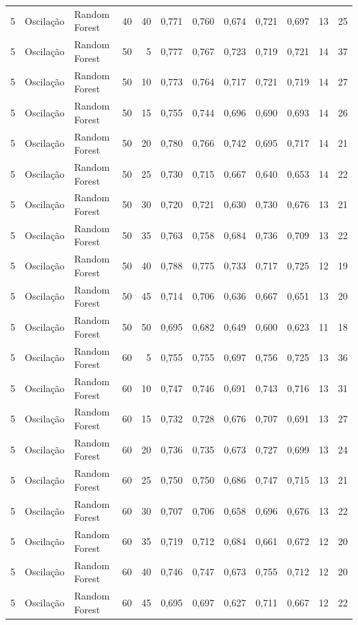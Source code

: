 \begin{longtable}{@{}rllrrrrrrrrr@{}}
5 & Oscilação & Random Forest & 40 & 40 & 0,771 & 0,760 & 0,674 & 0,721 & 0,697 & 13 & 25 \\
5 & Oscilação & Random Forest & 50 & 5 & 0,777 & 0,767 & 0,723 & 0,719 & 0,721 & 14 & 37 \\
5 & Oscilação & Random Forest & 50 & 10 & 0,773 & 0,764 & 0,717 & 0,721 & 0,719 & 14 & 27 \\
5 & Oscilação & Random Forest & 50 & 15 & 0,755 & 0,744 & 0,696 & 0,690 & 0,693 & 14 & 26 \\
5 & Oscilação & Random Forest & 50 & 20 & 0,780 & 0,766 & 0,742 & 0,695 & 0,717 & 14 & 21 \\
5 & Oscilação & Random Forest & 50 & 25 & 0,730 & 0,715 & 0,667 & 0,640 & 0,653 & 14 & 22 \\
5 & Oscilação & Random Forest & 50 & 30 & 0,720 & 0,721 & 0,630 & 0,730 & 0,676 & 13 & 21 \\
5 & Oscilação & Random Forest & 50 & 35 & 0,763 & 0,758 & 0,684 & 0,736 & 0,709 & 13 & 22 \\
5 & Oscilação & Random Forest & 50 & 40 & 0,788 & 0,775 & 0,733 & 0,717 & 0,725 & 12 & 19 \\
5 & Oscilação & Random Forest & 50 & 45 & 0,714 & 0,706 & 0,636 & 0,667 & 0,651 & 13 & 20 \\
5 & Oscilação & Random Forest & 50 & 50 & 0,695 & 0,682 & 0,649 & 0,600 & 0,623 & 11 & 18 \\
5 & Oscilação & Random Forest & 60 & 5 & 0,755 & 0,755 & 0,697 & 0,756 & 0,725 & 13 & 36 \\
5 & Oscilação & Random Forest & 60 & 10 & 0,747 & 0,746 & 0,691 & 0,743 & 0,716 & 13 & 31 \\
5 & Oscilação & Random Forest & 60 & 15 & 0,732 & 0,728 & 0,676 & 0,707 & 0,691 & 13 & 27 \\
5 & Oscilação & Random Forest & 60 & 20 & 0,736 & 0,735 & 0,673 & 0,727 & 0,699 & 13 & 24 \\
5 & Oscilação & Random Forest & 60 & 25 & 0,750 & 0,750 & 0,686 & 0,747 & 0,715 & 13 & 21 \\
5 & Oscilação & Random Forest & 60 & 30 & 0,707 & 0,706 & 0,658 & 0,696 & 0,676 & 13 & 22 \\
5 & Oscilação & Random Forest & 60 & 35 & 0,719 & 0,712 & 0,684 & 0,661 & 0,672 & 12 & 20 \\
5 & Oscilação & Random Forest & 60 & 40 & 0,746 & 0,747 & 0,673 & 0,755 & 0,712 & 12 & 20 \\
5 & Oscilação & Random Forest & 60 & 45 & 0,695 & 0,697 & 0,627 & 0,711 & 0,667 & 12 & 22 \\

\end{longtable}

